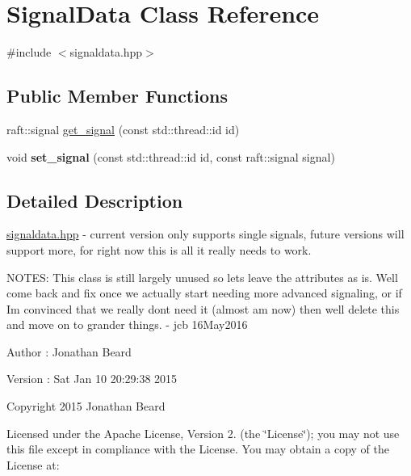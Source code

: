 \hypertarget{class_signal_data}{}\section{Signal\+Data Class Reference}
\label{class_signal_data}


{\ttfamily \#include $<$signaldata.\+hpp$>$}

\subsection*{Public Member Functions}
\begin{DoxyCompactItemize}
\item 
raft\+::signal \hyperlink{class_signal_data_a565e9b24fa291fffacf3182a60b95bbf}{get\+\_\+signal} (const std\+::thread\+::id id)
\item 
\hypertarget{class_signal_data_abb937d8c51f7be2b08b1b5824f98e02d}{}\label{class_signal_data_abb937d8c51f7be2b08b1b5824f98e02d} 
void {\bfseries set\+\_\+signal} (const std\+::thread\+::id id, const raft\+::signal signal)
\end{DoxyCompactItemize}


\subsection{Detailed Description}
\hyperlink{signaldata_8hpp_source}{signaldata.\+hpp} -\/ current version only supports single signals, future versions will support more, for right now this is all it really needs to work.

N\+O\+T\+ES\+: This class is still largely unused so lets leave the attributes as is. We\textquotesingle{}ll come back and fix once we actually start needing more advanced signaling, or if I\textquotesingle{}m convinced that we really don\textquotesingle{}t need it (almost am now) then we\textquotesingle{}ll delete this and move on to grander things. -\/ jcb 16\+May2016

\begin{DoxyAuthor}{Author}
\+: Jonathan Beard 
\end{DoxyAuthor}
\begin{DoxyVersion}{Version}
\+: Sat Jan 10 20\+:29\+:38 2015
\end{DoxyVersion}
Copyright 2015 Jonathan Beard

Licensed under the Apache License, Version 2. (the \char`\"{}\+License\char`\"{}); you may not use this file except in compliance with the License. You may obtain a copy of the License at\+:


